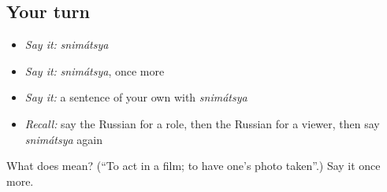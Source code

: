 \subsection*{Your turn}
\begin{itemize}
\raggedright
  \item \emph{Say it:} \emph{snimátsya}
  \item \emph{Say it:} \emph{snimátsya}, once more
  \item \emph{Say it:} a sentence of your own with \emph{snimátsya}
  \item \emph{Recall:} say the Russian for a role, then the Russian for a viewer, then say \emph{snimátsya} again
\end{itemize}

\begin{tcolorbox}[breakable,colback=teal!4,colframe=teal!35!black,title={Before you move on}]
What does  mean? (\textquotedblleft{}To act in a film; to have one's photo taken\textquotedblright{}.) Say it once more.
\end{tcolorbox}
